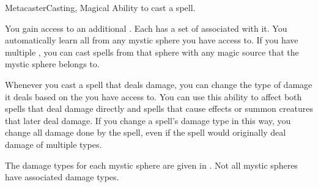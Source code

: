     \begin{feat}{Metacaster}{Casting, Magical}
        \featpre Ability to cast a spell.

         You gain access to an additional .
        Each  has a set of  associated with it.
        You automatically learn all  from any mystic sphere you have access to.
        If you have multiple , you can cast spells from that sphere with any magic source that the mystic sphere belongs to.

         Whenever you cast a spell that deals damage, you can change the type of damage it deals based on the  you have access to.
        You can use this ability to affect both spells that deal damage directly and spells that cause effects or summon creatures that later deal damage.
        If you change a spell's damage type in this way, you change all damage done by the spell, even if the spell would originally deal damage of multiple types.

        The damage types for each mystic sphere are given in .
        Not all mystic spheres have associated damage types.


\end{feat}
